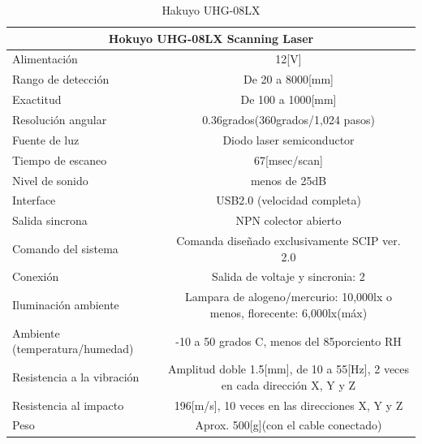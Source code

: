 \documentclass[a4paper]{book}
\begin{document}
\begin{table}[H]
\begin{center}
\begin{tabular}{|l|l|}%


\hline
\multicolumn{2}{|c|}{Hokuyo UHG-08LX Scanning Laser} \\ \hline %
Alimentación &  \multicolumn{1}{|c|}{12[V]}\\ \hline
Rango de detección & \multicolumn{1}{|c|}{De 20 a 8000[mm]}\\ \hline
Exactitud & \multicolumn{1}{|c|}{De 100 a 1000[mm]}\\ \hline
Resolución angular & \multicolumn{1}{|c|}{0.36grados(360grados/1,024 pasos)}\\ \hline

Fuente de luz & \multicolumn{1}{|c|}{Diodo laser semiconductor }\\ \hline
Tiempo de escaneo & \multicolumn{1}{|c|}{67[msec/scan]}\\ \hline
Nivel de sonido & \multicolumn{1}{|c|}{menos de 25dB}\\ \hline
Interface & \multicolumn{1}{|c|}{USB2.0 (velocidad completa)}\\ \hline
Salida sincrona & \multicolumn{1}{|c|}{NPN colector abierto}\\ \hline
Comando del sistema & \multicolumn{1}{|c|}{Comanda diseñado exclusivamente SCIP ver. 2.0}\\ \hline
Conexión & \multicolumn{1}{|c|}{Salida de voltaje y sincronia: 2}\\ \hline
Iluminación ambiente & \multicolumn{1}{|c|}{Lampara de alogeno/mercurio: 10,000lx o menos, florecente: 6,000lx(máx)}\\ \hline
Ambiente (temperatura/humedad) & \multicolumn{1}{|c|}{-10 a 50 grados C, menos del 85porciento RH}\\ \hline
Resistencia a la vibración & \multicolumn{1}{|c|}{Amplitud doble 1.5[mm], de 10 a 55[Hz], 2 veces en cada dirección X, Y y Z}\\ \hline
Resistencia al impacto & \multicolumn{1}{|c|}{196[m/s], 10 veces en las direcciones X, Y y Z}\\ \hline
Peso & \multicolumn{1}{|c|}{Aprox. 500[g](con el cable conectado)}\\ \hline

\end{tabular}
\caption{Hakuyo UHG-08LX}
\label{Datos del Hokuyo}
\end{center}
\end{table}
\end{document}
